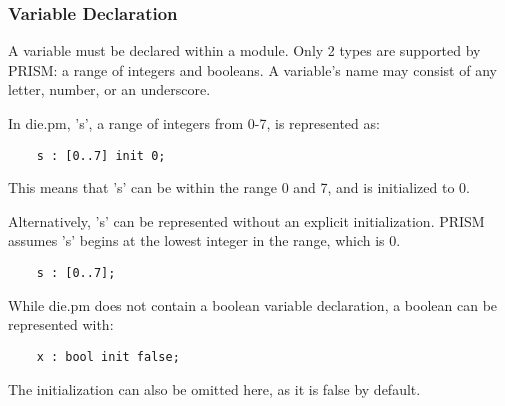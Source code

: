 \documentclass[a4paper]{article}
\begin{document}
\subsubsection{Variable Declaration} A variable must be declared within a module. Only 2 types are supported by PRISM: a range of integers and booleans. 
\newline
A variable's name may consist of any letter, number, or an underscore. 

In die.pm, 's', a range of integers from 0-7, is represented as:

\begin{lstlisting}
	s : [0..7] init 0;
\end{lstlisting}

This means that 's' can be within the range 0 and 7, and is initialized to 0. 

Alternatively, 's' can be represented without an explicit initialization. PRISM assumes 's' begins at the lowest integer in the range, which is 0.

\begin{lstlisting}
	s : [0..7];
\end{lstlisting}


While die.pm does not contain a boolean variable declaration, a boolean can be represented with:

\begin{lstlisting}
	x : bool init false;
\end{lstlisting}

The initialization can also be omitted here, as it is false by default. 
\end{document}
